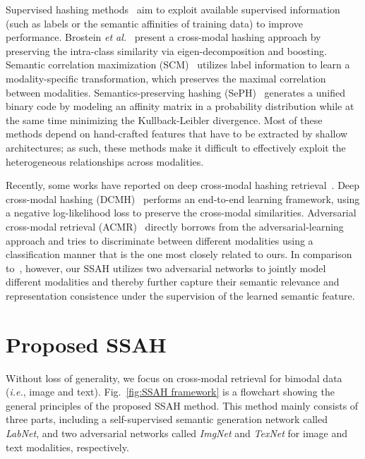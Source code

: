 \documentclass[10pt,twocolumn,letterpaper]{article}
\begin{document}
Supervised hashing methods~\cite{Bronstein2010Data, Cao2016Correlation, Kumar2011Learning, Lin2015CVPR, wang2013learning, Wu2014Sparse, Zhang2014Large} aim to exploit available supervised information (such as labels or the semantic affinities of training data) to improve performance. Brostein \emph{et al.}~\cite{Bronstein2010Data} present a cross-modal hashing approach by preserving the intra-class similarity via eigen-decomposition and boosting. Semantic correlation maximization (SCM)~\cite{Zhang2014Large} utilizes label information to learn a modality-specific transformation, which preserves the maximal correlation between modalities. Semantics-preserving hashing (SePH)~\cite{Lin2015CVPR} generates a unified binary code by modeling an affinity matrix in a probability distribution while at the same time minimizing the Kullback-Leibler divergence. Most of these methods depend on hand-crafted features that have to be extracted by shallow architectures; as such, these methods make it difficult to effectively exploit the heterogeneous relationships across modalities.

Recently, some works have reported on deep cross-modal hashing retrieval~\cite{Cao2016Deep, Liong2017ICCV, Jiang2017CVPR, Wang2017MM}. Deep cross-modal hashing (DCMH)~\cite{Jiang2017CVPR} performs an end-to-end learning framework, using a negative log-likelihood loss to preserve the cross-modal similarities. Adversarial cross-modal retrieval (ACMR)~\cite{Wang2017MM} directly borrows from the adversarial-learning approach and tries to discriminate between different modalities using a classification manner that is the one most closely related to ours. In comparison to~\cite{Wang2017MM}, however, our SSAH utilizes two adversarial networks to jointly model different modalities and thereby further capture their semantic relevance and representation consistence under the supervision of the learned semantic feature.
\vspace{-0.3cm}
\section{Proposed SSAH}
\vspace{-0.15cm}
\label{section: Proposed SSAH}
Without loss of generality, we focus on cross-modal retrieval for bimodal data (\emph{i.e.}, image and text). Fig.~\ref{fig:SSAH framework} is a flowchart showing the general principles of the proposed SSAH method. This method  mainly consists of three parts, including a self-supervised semantic generation network called \emph{LabNet}, and two adversarial networks called \emph{ImgNet} and \emph{TexNet} for image and text modalities, respectively.
\end{document}
